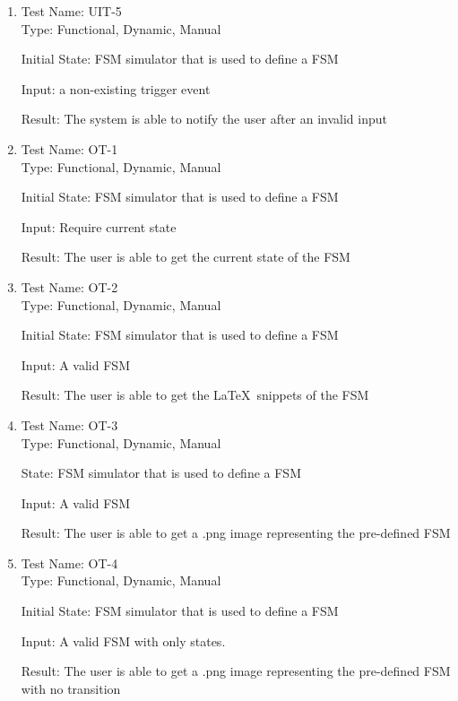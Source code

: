 \documentclass[12pt, titlepage]{article}
\begin{document}
\begin{enumerate}
        \item Test Name: UIT-5\\
        
            Type: Functional, Dynamic, Manual
  
            Initial State: FSM simulator that is used to define a FSM
  
            Input: a non-existing trigger event

            Result: The system is able to notify the user after an invalid input
        
        \item Test Name: OT-1\\
        
            Type: Functional, Dynamic, Manual
    					
            Initial State: FSM simulator that is used to define a FSM
					
            Input: Require current state

             Result: The user is able to get the current state of the FSM
        
        \item Test Name: OT-2\\
        
            Type: Functional, Dynamic, Manual
					
            Initial State: FSM simulator that is used to define a FSM
					
            Input: A valid FSM

            Result: The user is able to get the \LaTeX\ snippets of the FSM
            
        \item Test Name: OT-3 \\
        
            Type: Functional, Dynamic, Manual
    
            State: FSM simulator that is used to define a FSM

            Input: A valid FSM

            Result: The user is able to get a .png image representing the pre-defined FSM
            
        \item Test Name: OT-4 \\
        
            Type: Functional, Dynamic, Manual
            
            Initial State: FSM simulator that is used to define a FSM

            Input: A valid FSM with only states.

            Result: The user is able to get a .png image representing the pre-defined FSM with no transition
    \end{enumerate}
    
\end{document}
